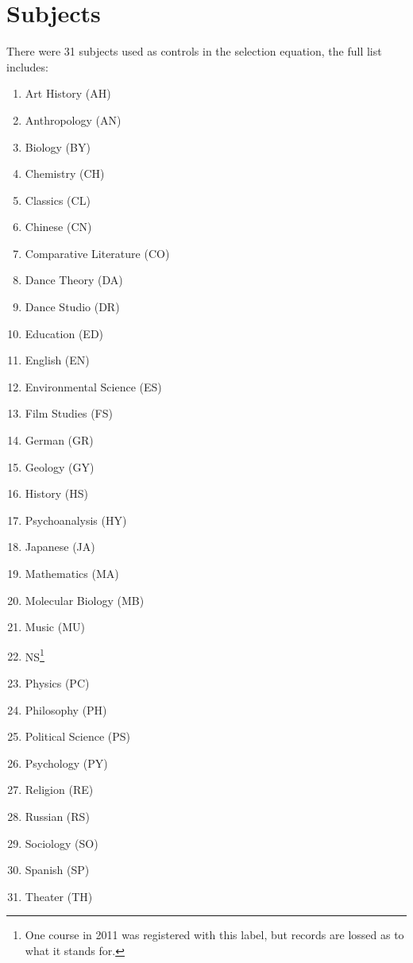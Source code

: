 \section{Subjects}\label{appendix:a}

There were 31 subjects used as controls in the selection equation, the full list includes:
\begin{multicols}{2}
  \begin{enumerate}
    \itemsep0em
  \item{Art History (AH)} 
  \item{Anthropology (AN)}
  \item{Biology (BY)}
  \item{Chemistry (CH)}
  \item{Classics (CL)}
  \item{Chinese (CN)}
  \item{Comparative Literature (CO)}
  \item{Dance Theory (DA)}
  \item{Dance Studio (DR)}
  \item{Education (ED)}
  \item{English (EN)}
  \item{Environmental Science (ES)}
  \item{Film Studies (FS)}
  \item{German (GR)}
  \item{Geology (GY)}
  \item{History (HS)}
  \item{Psychoanalysis (HY)}
  \item{Japanese (JA)}
  \item{Mathematics (MA)}
  \item{Molecular Biology (MB)}
  \item{Music (MU)}
  \item{NS\footnote{One course in 2011 was registered with this label, but records are lossed as to what it stands for.}}
  \item{Physics (PC)}
  \item{Philosophy (PH)}
  \item{Political Science (PS)}
  \item{Psychology (PY)}
  \item{Religion (RE)}
  \item{Russian (RS)}
  \item{Sociology (SO)}
  \item{Spanish (SP)}
  \item{Theater (TH)}
  \end{enumerate}
\end{multicols}

